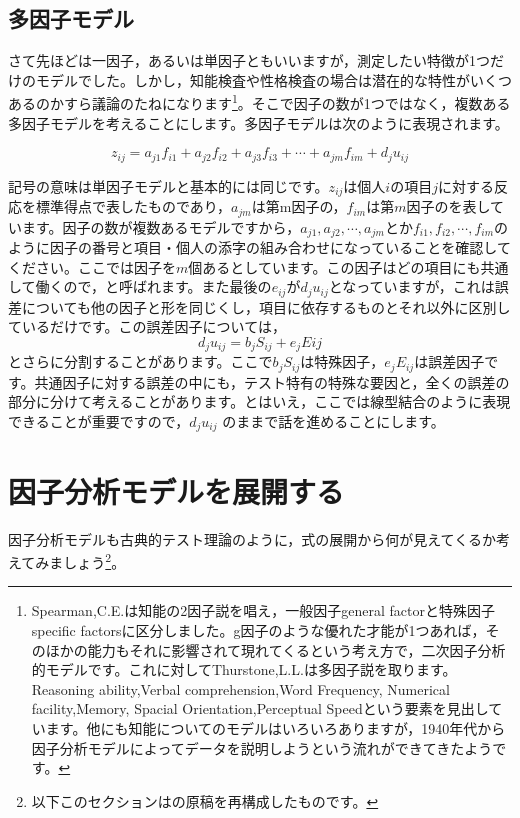 \documentclass{ltjsbook}
\begin{document}
\subsection{多因子モデル}
さて先ほどは一因子，あるいは単因子ともいいますが，測定したい特徴が1つだけのモデルでした。しかし，知能検査や性格検査の場合は潜在的な特性がいくつあるのかすら議論のたねになります\footnote{Spearman,C.E.は知能の2因子説を唱え，一般因子general factorと特殊因子specific factorsに区分しました。g因子のような優れた才能が1つあれば，そのほかの能力もそれに影響されて現れてくるという考え方で，二次因子分析的モデルです。これに対してThurstone,L.L.は多因子説を取ります。Reasoning ability,Verbal comprehension,Word Frequency, Numerical facility,Memory, Spacial Orientation,Perceptual Speedという要素を見出しています。他にも知能についてのモデルはいろいろありますが，1940年代から因子分析モデルによってデータを説明しようという流れができてきたようです。}。そこで因子の数が1つではなく，複数ある多因子モデルを考えることにします。多因子モデルは次のように表現されます。

\begin{equation}
	z_{ij} = a_{j1}f_{i1} + a_{j2}f_{i2}+a_{j3}f_{i3} + \cdots + a_{jm}f_{im} + d_j u_{ij}
	\label{factor}
\end{equation}

記号の意味は単因子モデルと基本的には同じです。$z_{ij}$は個人$i$の項目$j$に対する反応を標準得点で表したものであり，$a_{jm}$は第m因子の，$f_{im}$は第$m$因子のを表しています。因子の数が複数あるモデルですから，$a_{j1},a_{j2},\cdots, a_{jm}$とか$f_{i1},f_{i2},\cdots, f_{im}$のように因子の番号と項目・個人の添字の組み合わせになっていることを確認してください。ここでは因子を$m$個あるとしています。この因子はどの項目にも共通して働くので，と呼ばれます。また最後の$e_{ij}$が$d_j u_{ij}$となっていますが，これは誤差についても他の因子と形を同じくし，項目に依存するものとそれ以外に区別しているだけです。この誤差因子については，
\[ d_j u_{ij} = b_jS_{ij} + e_jE{ij} \]
とさらに分割することがあります。ここで$b_jS_{ij}$は特殊因子，$e_jE_{ij}$は誤差因子です。共通因子に対する誤差の中にも，テスト特有の特殊な要因と，全くの誤差の部分に分けて考えることがあります。とはいえ，ここでは線型結合のように表現できることが重要ですので，$d_ju_{ij}$ のままで話を進めることにします。

\section{因子分析モデルを展開する}
因子分析モデルも古典的テスト理論のように，式の展開から何が見えてくるか考えてみましょう\footnote{以下このセクションは\textcite{kosugi2018}の原稿を再構成したものです。}。
\end{document}
